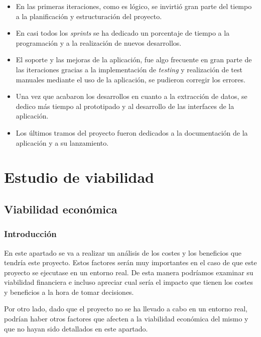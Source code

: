 \begin{itemize}
\item En las primeras iteraciones, como es lógico, se invirtió gran parte del tiempo a la planificación y estructuración del proyecto.

\item En casi todos los \textit{sprints} se ha dedicado un porcentaje de tiempo a la programación y a la realización de nuevos desarrollos.

\item El soporte y las mejoras de la aplicación, fue algo frecuente en gran parte de las iteraciones gracias a la implementación de \textit{testing} y realización de test manuales mediante el uso de la aplicación, se pudieron corregir los errores.

\item Una vez que acabaron los desarrollos en cuanto a la extracción de datos, se dedico más tiempo al prototipado y al desarrollo de las interfaces de la aplicación.

\item Los últimos tramos del proyecto fueron dedicados a la documentación de la aplicación y a su lanzamiento.

\end{itemize}

\section{Estudio de viabilidad}

\subsection{Viabilidad económica}

\subsubsection{Introducción}
En este apartado se va a realizar un análisis de los costes y los beneficios que tendría este proyecto. Estos factores serán muy importantes en el caso de que este proyecto se ejecutase en un entorno real. De esta manera podríamos examinar su viabilidad financiera e incluso apreciar cual sería el impacto que tienen los costes y beneficios a la hora de tomar decisiones.

Por otro lado, dado que el proyecto no se ha llevado a cabo  en un entorno real, podrían haber otros factores que afecten a la viabilidad económica del mismo y que no hayan sido detallados en este apartado.

